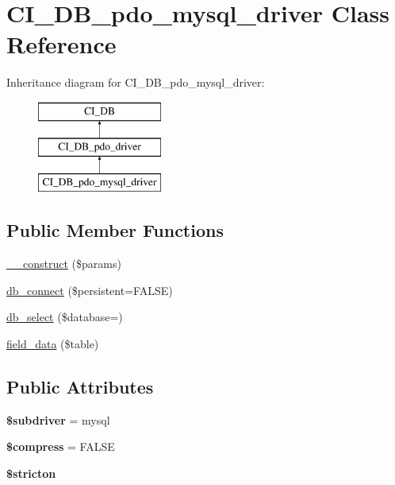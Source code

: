 \hypertarget{class_c_i___d_b__pdo__mysql__driver}{}\section{C\+I\+\_\+\+D\+B\+\_\+pdo\+\_\+mysql\+\_\+driver Class Reference}
\label{class_c_i___d_b__pdo__mysql__driver}
Inheritance diagram for C\+I\+\_\+\+D\+B\+\_\+pdo\+\_\+mysql\+\_\+driver\+:\begin{figure}[H]
\begin{center}
\leavevmode
\includegraphics[height=3.000000cm]{class_c_i___d_b__pdo__mysql__driver}
\end{center}
\end{figure}
\subsection*{Public Member Functions}
\begin{DoxyCompactItemize}
\item 
\mbox{\hyperlink{class_c_i___d_b__pdo__mysql__driver_a59b7088e50363395c71c40204ffb7733}{\+\_\+\+\_\+construct}} (\$params)
\item 
\mbox{\hyperlink{class_c_i___d_b__pdo__mysql__driver_a284f0abbd06ce4b99c5d48fa418e4a1b}{db\+\_\+connect}} (\$persistent=F\+A\+L\+SE)
\item 
\mbox{\hyperlink{class_c_i___d_b__pdo__mysql__driver_af8f4b4cd0dce2a1ef43c695744cbbbaa}{db\+\_\+select}} (\$database=\textquotesingle{}\textquotesingle{})
\item 
\mbox{\hyperlink{class_c_i___d_b__pdo__mysql__driver_a678a7f3f1a0b06d22882b89b9d7f5e82}{field\+\_\+data}} (\$table)
\end{DoxyCompactItemize}
\subsection*{Public Attributes}
\begin{DoxyCompactItemize}
\item 
\mbox{\label{class_c_i___d_b__pdo__mysql__driver_a7586e8a2e95cbe7665b32b422219cc77}} 
{\bfseries \$subdriver} = \textquotesingle{}mysql\textquotesingle{}
\item 
\mbox{\label{class_c_i___d_b__pdo__mysql__driver_a17480f70c18efab427c22a9a69917f30}} 
{\bfseries \$compress} = F\+A\+L\+SE
\item 
\mbox{\label{class_c_i___d_b__pdo__mysql__driver_ae4bec4b8cc75005ab119a62aa01ef6ec}} 
{\bfseries \$stricton}
\end{DoxyCompactItemize}
